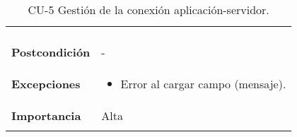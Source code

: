 \begin{longtable}[h!]{@{}ll@{}}
\begin{minipage}[t]{0.71\columnwidth}
\begin{enumerate}
\end{enumerate}\strut
\end{minipage}\tabularnewline
\begin{minipage}[t]{0.23\columnwidth}\raggedright\strut
\textbf{Postcondición}\strut
\end{minipage} & \begin{minipage}[t]{0.71\columnwidth}\raggedright\strut
-\strut
\end{minipage}\tabularnewline
\begin{minipage}[t]{0.23\columnwidth}\raggedright\strut
\textbf{Excepciones}\strut
\end{minipage} & \begin{minipage}[t]{0.71\columnwidth}\raggedright\strut
\begin{itemize}
\tightlist
\item
  Error al cargar campo (mensaje).
\end{itemize}\strut
\end{minipage}\tabularnewline
\begin{minipage}[t]{0.23\columnwidth}\raggedright\strut
\textbf{Importancia}\strut
\end{minipage} & \begin{minipage}[t]{0.71\columnwidth}\raggedright\strut
Alta\strut
\end{minipage}\tabularnewline
\bottomrule
\caption{CU-5 Gestión de la conexión aplicación-servidor.}
\end{longtable}


